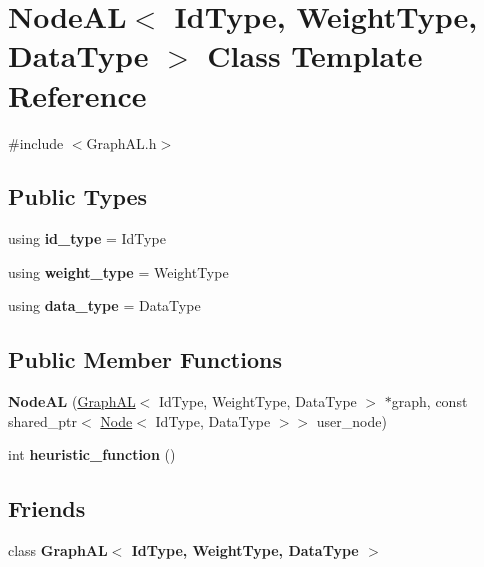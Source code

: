 \hypertarget{class_node_a_l}{}\section{Node\+AL$<$ Id\+Type, Weight\+Type, Data\+Type $>$ Class Template Reference}
\label{class_node_a_l}


{\ttfamily \#include $<$Graph\+A\+L.\+h$>$}

\subsection*{Public Types}
\begin{DoxyCompactItemize}
\item 
\mbox{\label{class_node_a_l_ab4a77af4dc330af7612369aa37bb8e9c}} 
using {\bfseries id\+\_\+type} = Id\+Type
\item 
\mbox{\label{class_node_a_l_a5558aa6013bcf5aecfd1eaacd59ae121}} 
using {\bfseries weight\+\_\+type} = Weight\+Type
\item 
\mbox{\label{class_node_a_l_a4b0d8ef14fa97d2b69f8a288d84298ec}} 
using {\bfseries data\+\_\+type} = Data\+Type
\end{DoxyCompactItemize}
\subsection*{Public Member Functions}
\begin{DoxyCompactItemize}
\item 
\mbox{\label{class_node_a_l_a64fec8b2f5d97ef17285e4691508229f}} 
{\bfseries Node\+AL} (\hyperlink{class_graph_a_l}{Graph\+AL}$<$ Id\+Type, Weight\+Type, Data\+Type $>$ $\ast$graph, const shared\+\_\+ptr$<$ \hyperlink{class_node}{Node}$<$ Id\+Type, Data\+Type $>$$>$ user\+\_\+node)
\item 
\mbox{\label{class_node_a_l_a28d533f274d51f8458a86b96f996b795}} 
int {\bfseries heuristic\+\_\+function} ()
\end{DoxyCompactItemize}
\subsection*{Friends}
\begin{DoxyCompactItemize}
\item 
\mbox{\label{class_node_a_l_a0a20338520096d3c82b92fe38a4701f7}} 
class {\bfseries Graph\+A\+L$<$ Id\+Type, Weight\+Type, Data\+Type $>$}
\end{DoxyCompactItemize}


